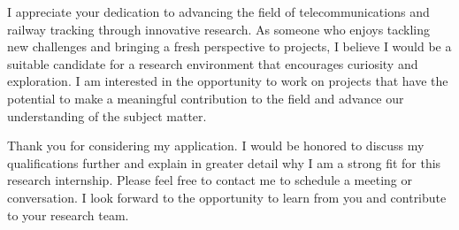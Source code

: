 \documentclass[11pt, a4paper]{awesome-cv}
\begin{document}
\begin{cvletter}
I appreciate your dedication to advancing the field of telecommunications and railway tracking through innovative research. As someone who enjoys tackling new challenges and bringing a fresh perspective to projects, I believe I would be a suitable candidate for a research environment that encourages curiosity and exploration. I am interested in the opportunity to work on projects that have the potential to make a meaningful contribution to the field and advance our understanding of the subject matter.

Thank you for considering my application. I would be honored to discuss my qualifications further and explain in greater detail why I am a strong fit for this research internship. Please feel free to contact me to schedule a meeting or conversation. I look forward to the opportunity to learn from you and contribute to your research team.
\end{cvletter}


\makeletterclosing
\end{document}
